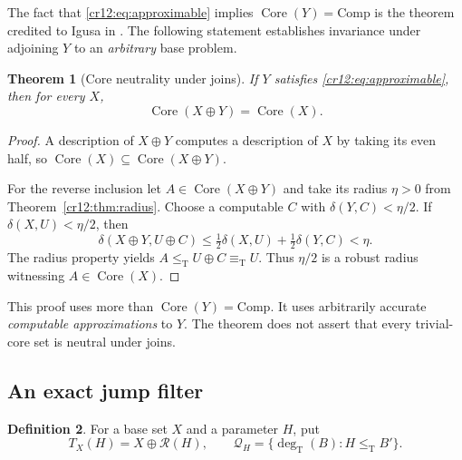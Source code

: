 \documentclass[11pt,letterpaper]{article}
\theoremstyle{plain}
\newtheorem{theorem}{Theorem}[section]
\theoremstyle{definition}
\newtheorem{definition}[theorem]{Definition}
\theoremstyle{remark}
\numberwithin{equation}{section}
\newcommand{\leT}{\leq_{\mathrm T}}
\newcommand{\eqT}{\equiv_{\mathrm T}}
\newcommand{\Core}{\operatorname{Core}}
\newcommand{\Comp}{\mathrm{Comp}}
\newcommand{\degT}{\deg_{\mathrm T}}
\newcommand{\Rcode}{\mathcal R}
\begin{document}
The fact that \eqref{cr12:eq:approximable} implies $\Core(Y)=\Comp$ is the theorem
credited to Igusa in \cite[Theorem~4.3]{HJKS}. The following statement establishes
invariance under adjoining $Y$ to an \emph{arbitrary} base problem.

\begin{theorem}[Core neutrality under joins]\label{cr12:thm:neutral}
If $Y$ satisfies \eqref{cr12:eq:approximable}, then for every $X$,
\begin{equation}\label{cr12:eq:neutral}
 \Core(X\oplus Y)=\Core(X).
\end{equation}
\end{theorem}
\begin{proof}
A description of $X\oplus Y$ computes a description of $X$ by taking its even
half, so $\Core(X)\subseteq\Core(X\oplus Y)$.

For the reverse inclusion let $A\in\Core(X\oplus Y)$ and take its radius
$\eta>0$ from Theorem~\ref{cr12:thm:radius}. Choose a computable $C$ with
$\delta(Y,C)<\eta/2$. If $\delta(X,U)<\eta/2$, then
\[
 \delta(X\oplus Y,U\oplus C)
 \le\tfrac12\delta(X,U)+\tfrac12\delta(Y,C)<\eta.
\]
The radius property yields $A\leT U\oplus C\eqT U$.
Thus $\eta/2$ is a robust radius witnessing $A\in\Core(X)$.
\end{proof}

This proof uses more than $\Core(Y)=\Comp$. It uses arbitrarily accurate
\emph{computable approximations} to $Y$. The theorem does not assert that every
trivial-core set is neutral under joins.

\subsection{An exact jump filter}
\begin{definition}
For a base set $X$ and a parameter $H$, put
\[
 T_X(H)=X\oplus\Rcode(H),\qquad
 \mathcal Q_H=\{\degT(B):H\leT B'\}.
\]
\end{definition}
\end{document}
